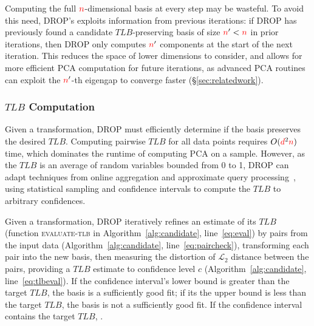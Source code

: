 Computing the full ${\color{red}n}$-dimensional basis at every step may be wasteful. 
To avoid this need, DROP's exploits information from previous iterations:  if DROP has previously found a candidate $TLB$-preserving basis of size ${\color{red}n}' < {\color{red}n}$ in prior iterations, then DROP only computes ${\color{red}n}'$ components at the start of the next iteration. 
This reduces the space of lower dimensions to consider, and allows for more efficient PCA computation for future iterations, as advanced PCA routines can exploit the ${\color{red}n}'$-th eigengap to converge faster (\S\ref{sec:relatedwork}).


\subsubsection{$TLB$ Computation}

Given a transformation, DROP must efficiently determine if the basis preserves the desired $TLB$.
Computing pairwise $TLB$ for all data points requires $O({\color{red}d}^2{\color{red}n})$ time, which dominates the runtime of computing PCA on a sample.
However, as the $TLB$ is an average of random variables bounded from 0 to 1, DROP can adapt techniques from online aggregation and approximate query processing~\cite{onlineagg,barzan-keynote}, using statistical sampling and confidence intervals to compute the $TLB$ to arbitrary confidences.

Given a transformation, DROP iteratively refines an estimate of its $TLB$ (function \textsc{evaluate-tlb} in Algorithm~\ref{alg:candidate}, line~\ref{eq:eval}) by  pairs from the input data (Algorithm~\ref{alg:candidate}, line~\ref{eq:paircheck}), transforming each pair into the new basis, then measuring the distortion of $\mathcal{L}_2$ distance between the pairs, providing a $TLB$ estimate to confidence level $c$ (Algorithm~\ref{alg:candidate}, line~\ref{eq:tlbeval}). 
If the confidence interval's lower bound is greater than the target $TLB$, the basis is a sufficiently good fit; if its the upper bound is less than the target $TLB$, the basis is not a sufficiently good fit. 
If the confidence interval contains the target $TLB$,  .

